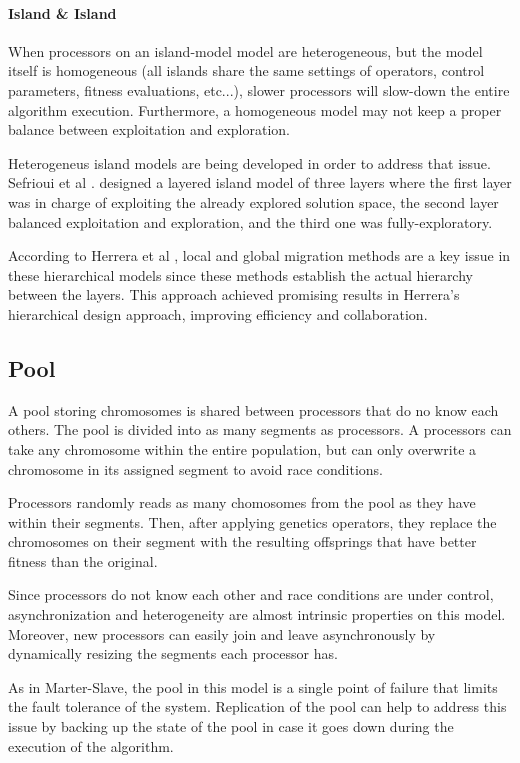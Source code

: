 \paragraph*{Island \& Island} When processors on an island-model model are heterogeneous, but the model itself is homogeneous (all islands share the same settings of operators, control parameters, fitness evaluations, etc...), slower processors will slow-down the entire algorithm execution. Furthermore, a homogeneous model may not keep a proper balance between exploitation and exploration.  

Heterogeneus island models are being developed in order to address that issue. Sefrioui et al \cite{112}. designed a layered island model of three layers where the first layer was in charge of exploiting the already explored solution space, the second layer balanced exploitation and exploration, and the third one was fully-exploratory.

According to Herrera et al \cite{57}, local and global migration methods are a key issue in these hierarchical models since these methods establish the actual hierarchy between the layers. This approach achieved promising results in Herrera's hierarchical design approach, improving efficiency and collaboration. 

\subsection{Pool}
A pool storing chromosomes is shared between processors that do no know each others. The pool is divided into as many segments as processors. A processors can take any chromosome within the entire population, but can only overwrite a chromosome in its assigned segment to avoid race conditions.

Processors randomly reads as many chomosomes from the pool as they have within their segments. Then, after applying genetics operators, they replace the chromosomes on their segment with the resulting offsprings that have better fitness than the original. 

Since processors do not know each other and race conditions are under control, asynchronization and heterogeneity are almost intrinsic properties on this model. Moreover, new processors can easily join and leave asynchronously by dynamically resizing the segments each processor has.

As in Marter-Slave, the pool in this model is a single point of failure that limits the fault tolerance of the system. Replication of the pool can help to address this issue by backing up the state of the pool in case it goes down during the execution of the algorithm. 

